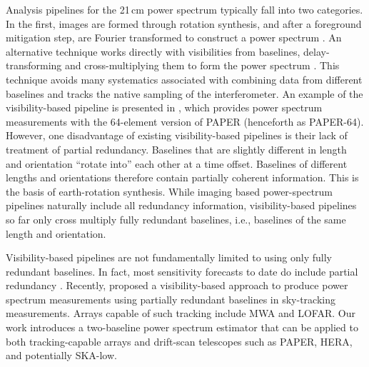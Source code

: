 \documentclass[twocolumn,apj,numberedappendix]{emulateapj}
\renewcommand\[{\begin{equation}}
\renewcommand\]{\end{equation}}
\begin{document}
Analysis pipelines for the 21\,cm power spectrum typically fall into two categories. In the first, images are formed through rotation synthesis, and after a foreground mitigation step, are Fourier transformed to construct a power spectrum \citep{MWAresult0, MWAresult1, LOFARresult}. An alternative technique works directly with visibilities from baselines, delay-transforming and cross-multiplying them to form the power spectrum \citep{delay-transform}. This technique avoids many systematics associated with combining data from different baselines and tracks the native sampling of the interferometer. An example of the visibility-based pipeline is presented in \cite{Ali2015}, which provides power spectrum
measurements with the 64-element version of PAPER (henceforth as PAPER-64). However, one disadvantage of existing visibility-based pipelines is their lack of treatment of partial redundancy. Baselines that are slightly different in length and orientation
``rotate into'' each other at a time offset. Baselines of different lengths and orientations therefore contain partially coherent information. This is the basis of earth-rotation synthesis. While imaging based power-spectrum pipelines naturally include all redundancy information, visibility-based pipelines so far only cross multiply fully redundant baselines, i.e., baselines of the same length and orientation.

Visibility-based pipelines are not fundamentally limited to using only fully redundant baselines. In fact, most sensitivity forecasts to date do include partial redundancy \citep{Pobersens, HERA, JoshAntPos}. Recently, \cite{wterm} proposed a visibility-based approach to produce power spectrum measurements using partially redundant baselines in sky-tracking measurements. Arrays capable of such tracking include MWA and LOFAR. Our work introduces a two-baseline power spectrum estimator that can be applied to both tracking-capable arrays and drift-scan telescopes such as PAPER, HERA, and potentially SKA-low.
\end{document}
